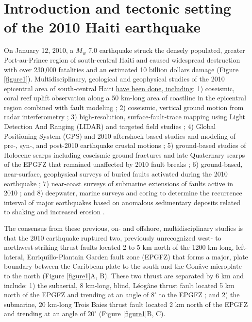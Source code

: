 \documentclass[linenumbers,draft]{agujournal}
\begin{document}
\section{Introduction and tectonic setting of the 2010 Haiti earthquake}
\label{sec:intro}
On January 12, 2010, a $M_w$ 7.0 earthquake struck the densely populated, greater Port-au-Prince region of south-central Haiti and caused widespread destruction with over 230,000 fatalities and an estimated 10 billion dollars damage \citep{prentice2010seismic,bilham2010lessons,paultre2013damage,kocel2016near} (Figure \ref{figure1}). Multidisciplinary, geological and geophysical studies of the 2010 epicentral area of south-central Haiti \ul{have been done, including}: 1) coseismic, coral reef uplift observation along a 50 km-long area of coastline in the epicentral region combined with fault modeling \citep{hayes2010complex}; 2) coseismic, vertical ground motion from radar interferometry \citep{hashimoto2011fan}; 3) high-resolution, surface-fault-trace mapping using Light Detection And Ranging (LIDAR) and targeted field studies \citep{cowgill2012interactive}; 4) Global Positioning System (GPS) and 2010 aftershock-based studies and modeling of pre-, syn-, and post-2010 earthquake crustal motions \citep{calais2010transpressional,nettles2010earthquake,symithe2013coseismic,douilly2013crustal,douilly2015three}; 5) ground-based studies of Holocene scarps including coseismic ground fractures and late Quaternary scarps of the EPGFZ that remained unaffected by 2010 fault breaks \citep{prentice2010seismic,koehler2011field,rathje2014geotechnical,saint2015seismotectonics}; 6) ground-based, near-surface, geophysical surveys of buried faults activated during the 2010 earthquake \citep{kocel2016near}; 7) near-coast surveys of submarine extensions of faults active in 2010 \citep{hornbach2010high,mercier20112010}; and 8) deepwater, marine surveys and coring to determine the recurrence interval of major earthquakes based on anomalous sedimentary deposits related to shaking and increased erosion \citep{mchugh2011offshore}.

The consensus from these previous, on- and offshore, multidisciplinary studies is that the 2010 earthquake ruptured two, previously unrecognized west- to northwest-striking thrust faults located 2 to 5 km north of the 1200 km-long, left-lateral, Enriquillo-Plantain Garden fault zone (EPGFZ) that forms a major, plate boundary between the Caribbean plate to the south and the Gon\^ave microplate to the north \citep{mann1995actively,calais2010transpressional,benford2012gps,corbeau2016transpressive} (Figure \ref{figure1}A, B). These two thrust are separated by 6 km and include: 1) the subaerial, 8 km-long, blind, L\'eog\^ane thrust fault located 5 km north of the EPGFZ and trending at an angle of $8^{\circ}$ to the EPGFZ \citep{calais2010transpressional,douilly2013crustal,douilly2015three}; and 2) the submarine, 20 km-long Trois Baies thrust fault located 2 km north of the EPGFZ and trending at an angle of $20^{\circ}$ \citep{mercier20112010,symithe2013coseismic} (Figure \ref{figure1}B, C).
\end{document}
